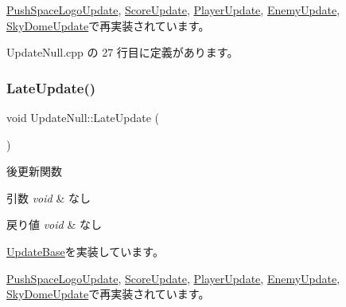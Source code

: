 \mbox{\hyperlink{class_push_space_logo_update_a9c165604160c012b429c1db1d67ffb2a}{Push\+Space\+Logo\+Update}}, \mbox{\hyperlink{class_score_update_afd51e11ad00ebc15d9b3139398437afc}{Score\+Update}}, \mbox{\hyperlink{class_player_update_ac72b39db7b7bfaf094bde9ed1adef4b7}{Player\+Update}}, \mbox{\hyperlink{class_enemy_update_a5b68696e964f71fca73c9143e3770c9d}{Enemy\+Update}}, \mbox{\hyperlink{class_sky_dome_update_ab4fec6d13590c07e39e6e8b4f7f7613a}{Sky\+Dome\+Update}}で再実装されています。



 Update\+Null.\+cpp の 27 行目に定義があります。

\mbox{\label{class_update_null_a8d335882bce4eab384d44c4bae474ee5}} 
\subsubsection{\texorpdfstring{Late\+Update()}{LateUpdate()}}
{\footnotesize\ttfamily void Update\+Null\+::\+Late\+Update (\begin{DoxyParamCaption}{ }\end{DoxyParamCaption})\hspace{0.3cm}{\ttfamily [virtual]}}



後更新関数 


\begin{DoxyParams}{引数}
{\em void} & なし \\
\hline
\end{DoxyParams}

\begin{DoxyRetVals}{戻り値}
{\em void} & なし \\
\hline
\end{DoxyRetVals}


\mbox{\hyperlink{class_update_base_afc4956f78135aed5fc4e4f9991be50b9}{Update\+Base}}を実装しています。



\mbox{\hyperlink{class_push_space_logo_update_a4423864fb22b1211e92a4317d0b70a44}{Push\+Space\+Logo\+Update}}, \mbox{\hyperlink{class_score_update_adc9a48f54828e49c072c298777935893}{Score\+Update}}, \mbox{\hyperlink{class_player_update_ae376f517f3458edfef61ac366aa78e36}{Player\+Update}}, \mbox{\hyperlink{class_enemy_update_ae14e4ebb42ad9043534e53edcba5b242}{Enemy\+Update}}, \mbox{\hyperlink{class_sky_dome_update_a94347cb50b4dc13528738a7b812da261}{Sky\+Dome\+Update}}で再実装されています。



